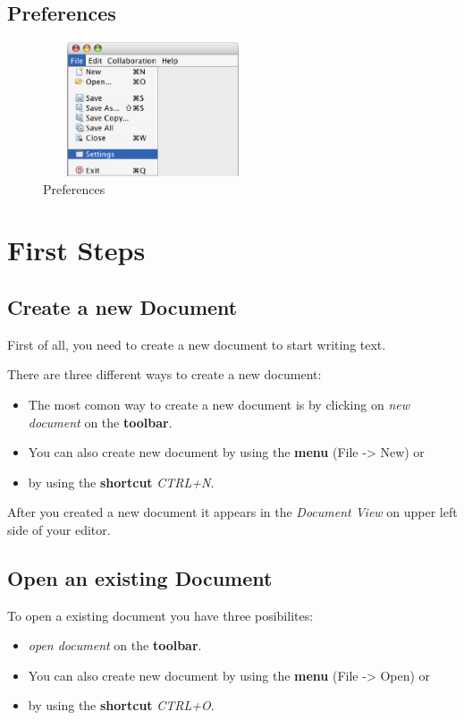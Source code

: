 \documentclass[11pt,a4paper]{article}
\begin{document}
\subsection{Preferences}
\begin{figure}[H]
\begin{center}
  \includegraphics[height=1.56in, width=2.56in]{../images/usermanual/nmenu_file_preferences.bmp.eps}
\caption{Preferences}
\label{default}
\end{center}
\end{figure}




\newpage
\section{First Steps}
\label{first_steps}

\subsection{Create a new Document}
First of all, you need to create a new document to start writing text.

There are three different ways to create a new document:
\begin{itemize}
\item The most comon way to create a new document is by clicking on \textit{new document} on the \textbf{toolbar}.
\item You can also create new document by using the \textbf{menu} (File -> New) or
\item by using the \textbf{shortcut} \textit{CTRL+N}.
\end{itemize}

After you created a new document it appears in the \textit{Document View} on upper left side of your editor.

\subsection{Open an existing Document}
To open a existing document you have three posibilites:
\begin{itemize}
\item \textit{open document} on the \textbf{toolbar}.
\item You can also create new document by using the \textbf{menu} (File -> Open) or
\item by using the \textbf{shortcut} \textit{CTRL+O}.
\end{itemize}
\end{document}
